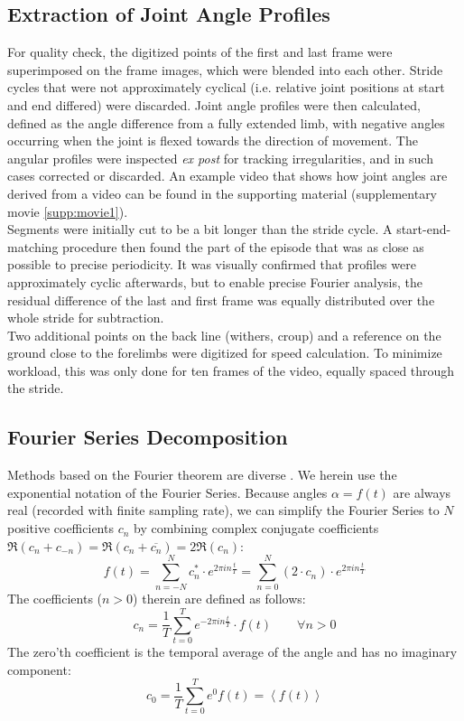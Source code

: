 \subsection{Extraction of Joint Angle Profiles}\label{apdx:digitization}
For quality check, the digitized points of the first and last frame were superimposed on the frame images, which were blended into each other.
Stride cycles that were not approximately cyclical (i.e. relative joint positions at start and end differed) were discarded.
Joint angle profiles were then calculated, defined as the angle difference from a fully extended limb, with negative angles occurring when the joint is flexed towards the direction of movement.
The angular profiles were inspected \textit{ex post} for tracking irregularities, and in such cases corrected or discarded.
An example video that shows how joint angles are derived from a video can be found in the supporting material (supplementary movie \ref{supp:movie1}).
\\Segments were initially cut to be a bit longer than the stride cycle.
A start-end-matching procedure then found the part of the episode that was as close as possible to precise periodicity.
It was visually confirmed that profiles were approximately cyclic afterwards, but to enable precise Fourier analysis, the residual difference of the last and first frame was equally distributed over the whole stride for subtraction.
\\Two additional points on the back line (withers, croup) and a reference on the ground close to the forelimbs were digitized for speed calculation.
To minimize workload, this was only done for ten frames of the video, equally spaced through the stride.



\subsection{Fourier Series Decomposition}\label{apdx:fourier}
Methods based on the Fourier theorem are diverse \cite{Fourier1822,Gray1995,Bracewell2000}.
We herein use the exponential notation of the Fourier Series.
Because angles $\alpha =f(t)$ are always real (recorded with finite sampling rate), we can simplify the Fourier Series to $N$ positive coefficients $c_{n}$ by combining complex conjugate coefficients $\Re(c_n + c_{-n}) = \Re(c_n + \overline{c_n}) = 2\Re(c_{n})$:
	\begin{equation}\label{eqn:fourier_series}
	f(t) = \sum\limits_{n=-N}^{N} c^{*}_{n}\cdot e^{2\pi i n \frac{t}{T}} = \sum\limits_{n=0}^{N} (2\cdot c_{n})\cdot e^{2\pi i n \frac{t}{T}}
	\end{equation}
The coefficients ($n>0$) therein are defined as follows:
	\begin{equation}\label{eqn:fourier_coefficients2}
	c_{n} = \frac{1}{T}\sum\limits_{t=0}^{T} e^{-2\pi i n \frac{t}{T}} \cdot f(t)  \quad\quad \forall n>0
	\end{equation}
	The zero'th coefficient is the temporal average of the angle and has no imaginary component:
	\begin{equation}\label{eqn:affines_mean}
	c_{0} = \frac{1}{T}\sum\limits_{t=0}^{T} e^{0} f(t) = \left\langle f(t)  \right\rangle
	\end{equation}

